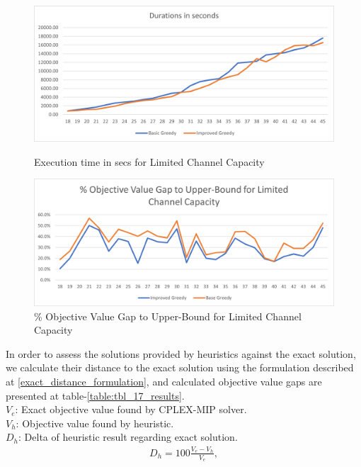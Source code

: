 \documentclass[11pt]{article}
\begin{document}
        \begin{figure}[htb!]
        \centering
        \begin{minipage}{.6\textwidth}
            \centering
            \includegraphics[width=.7\linewidth]{durations_ub_limited_18_45.png}
            \caption{Execution time in secs for Limited Channel Capacity}
            \label{fig:fig_durations_ub_limited_18_45}
        \end{minipage}%
        \begin{minipage}{.6\textwidth}
            \centering
            \includegraphics[width=.7\linewidth]{performance_ub_limited_18_45.png}
            \caption{\% Objective Value Gap to Upper-Bound for Limited Channel Capacity}
            \label{fig:fig_value_gap_ub_limited_18_45}
        \end{minipage}
        \end{figure}

        
\newpage
In order to assess the solutions provided by heuristics against the exact solution, we calculate their distance to the exact solution using the formulation described at \equationautorefname \eqref{exact_distance_formulation}, and calculated objective value gaps are presented at table-\ref{table:tbl_17_results}.\\

\noindent $V_{e}$: Exact objective value found by CPLEX-MIP solver. \\
\noindent $V_{h}$: Objective value found by heuristic. \\
\noindent $D_{h}$: Delta of heuristic result regarding exact solution. \\
\begin{align}
&D_{h} = 100 \frac{V_{e} - V_{h}}{V_{e}}, \label{exact_distance_formulation}&
\end{align}\\
\end{document}
